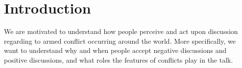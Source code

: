 \section{Introduction}
We are motivated to understand how people perceive and act upon discussion regarding to armed conflict occurring around the world. More specifically, we want to understand why and when people accept negative discussions and positive discussions, and what roles the features of conflicts play in the talk. 
